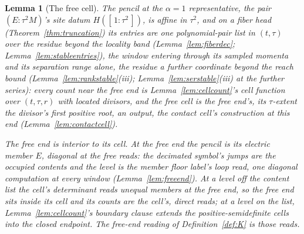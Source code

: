 \documentclass[11pt]{article}
\newtheorem{lemma}{Lemma}
\theoremstyle{definition}
\begin{document}
\begin{lemma}[The free cell]\label{lem:freecell}
The pencil at the $\alpha{=}1$ representative, the pair
$(E\!:\!\tau^2M)$'s site datum $H([\,1:\tau^2\,])$, is affine in
$\tau^2$, and on a fiber head (Theorem~\ref{thm:truncation}) its entries
are one polynomial-pair list in $(t,\tau)$ over the residue beyond
the locality band
(Lemma~\ref{lem:fiberdec}; Lemma~\ref{lem:stableentries}), the window
entering through its sampled momenta and its separation range alone,
the residue a further coordinate beyond the reach bound
(Lemma~\ref{lem:rankstable}(iii); Lemma~\ref{lem:serstable}(iii)
at the further series): every count near the free end is
Lemma~\ref{lem:cellcount}'s cell function over $(t,\tau,r)$ with
located divisors, and the \emph{free cell} is the free end's, its
$\tau$-extent the divisor's first positive root, an output, the
contact cell's construction at this end (Lemma~\ref{lem:contactcell}).

\emph{The free end is interior to its cell.} At the free end the
pencil is its electric member $E$,
diagonal at the free reads: the decimated symbol's jumps are the occupied
contents and the level is the member floor label's loop read, one
diagonal computation at every window (Lemma~\ref{lem:freeend}). At a
level off the content list the cell's determinant reads unequal
members at the free end, so the free end sits inside its cell and its counts are the
cell's, direct reads; at a level on the list,
Lemma~\ref{lem:cellcount}'s boundary clause extends the
positive-semidefinite cells into the closed endpoint. The free-end reading of
Definition~\ref{def:K} is those reads.

\end{lemma}
\end{document}
